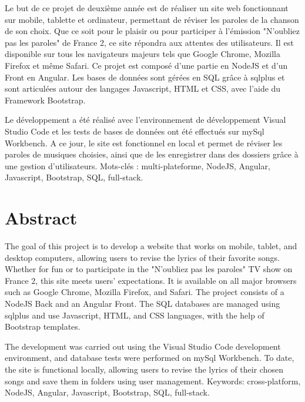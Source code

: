 \documentclass[12pt,french]{article}
\begin{document}
Le but de ce projet de deuxième année est de réaliser un site web fonctionnant sur mobile, tablette et ordinateur, permettant de réviser les paroles de la chanson de son choix. Que ce soit pour le plaisir ou pour participer à l'émission "N'oubliez pas les paroles" de France 2, ce site répondra aux attentes des utilisateurs. Il est disponible sur tous les navigateurs majeurs tels que Google Chrome, Mozilla Firefox et même Safari. Ce projet est composé d'une partie  en NodeJS et d'un \gls{Front} en Angular. Les bases de données sont gérées en \gls{SQL} grâce à sqlplus et sont articulées autour des langages \gls{Javascript}, \gls{HTML} et \gls{CSS}, avec l'aide du \gls{Framework} Bootstrap.
\newline 

Le développement a été réalisé avec l'environnement de développement Visual Studio Code et les tests de bases de données ont été effectués sur mySql Workbench. A ce jour, le site est fonctionnel en local et permet de réviser les paroles de musiques choisies, ainsi que de les enregistrer dans des dossiers grâce à une gestion d'utilisateurs.
\newline 
\newline
Mots-clés : multi-plateforme, NodeJS, Angular, \gls{Javascript}, Bootstrap, SQL, full-stack.

\section*{Abstract}

The goal of this project is to develop a website that works on mobile, tablet, and desktop computers, allowing users to revise the lyrics of their favorite songs. Whether for fun or to participate in the "N'oubliez pas les paroles" TV show on France 2, this site meets users' expectations. It is available on all major browsers such as Google Chrome, Mozilla Firefox, and Safari. The project consists of a NodeJS \gls{Back} and an Angular \gls{Front}. The \gls{SQL} databases are managed using sqlplus and use \gls{Javascript}, \gls{HTML}, and \gls{CSS} languages, with the help of Bootstrap templates.
\newline 

The development was carried out using the Visual Studio Code development environment, and database tests were performed on mySql Workbench. To date, the site is functional locally, allowing users to revise the lyrics of their chosen songs and save them in folders using user management.
\newline 
\newline 
Keywords: cross-platform, NodeJS, Angular, \gls{Javascript}, Bootstrap, \gls{SQL}, full-stack.
\end{document}
